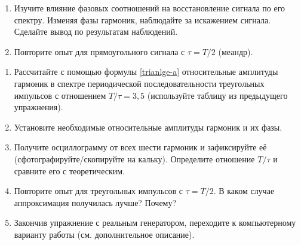 \begin{lab:task}
\begin{enumerate}
\item Изучите влияние фазовых соотношений на восстановление сигнала по
его спектру. Изменяя фазы гармоник, наблюдайте за искажением сигнала.
Сделайте вывод по результатам наблюдений.

\item Повторите опыт для прямоугольного сигнала с $\tau=T/2$ (меандр).

\end{enumerate}

\begin{enumerate}
	\item Рассчитайте с помощью формулы \eqref{trianlge-a} относительные
амплитуды гармоник в спектре периодической последовательности треугольных
импульсов с отношением $T/\tau=3,5$ (используйте таблицу из предыдущего
упражнения).
	\item Установите необходимые относительные амплитуды гармоник и их фазы.
	\item Получите осциллограмму от всех шести гармоник и
зафиксируйте её (сфотографируйте/скопируйте на кальку).
Определите отношение $T/\tau$ и сравните его с теоретическим.
        \item Повторите опыт для треугольных импульсов с $\tau=T/2$. В каком
случае аппроксимация получилась лучше? Почему?
	\item Закончив упражнение с реальным генератором, переходите к компьютерному
варианту работы (см. дополнительное описание).

\end{enumerate}

\end{lab:task}






